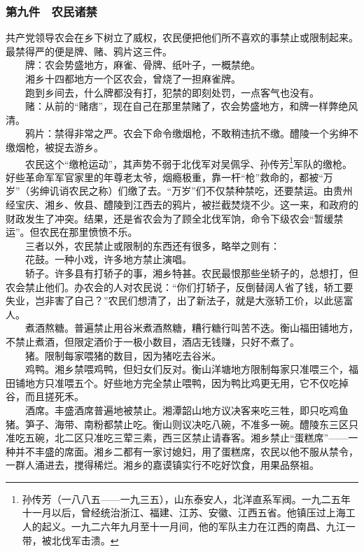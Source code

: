 \documentclass[cn,11pt,chinese]{elegantbook}
\def\myformat#1{\hfil\hfil #1}
\begin{document}
\subsubsection*{\myformat{第九件　农民诸禁}}
共产党领导农会在乡下树立了威权，农民便把他们所不喜欢的事禁止或限制起来。最禁得严的便是牌、赌、鸦片这三件。\\
　　牌：农会势盛地方，麻雀、骨牌、纸叶子，一概禁绝。\\
　　湘乡十四都地方一个区农会，曾烧了一担麻雀牌。\\
　　跑到乡间去，什么牌都没有打，犯禁的即刻处罚，一点客气也没有。\\
　　赌：从前的“赌痞”，现在自己在那里禁赌了，农会势盛地方，和牌一样弊绝风清。\\
　　鸦片：禁得非常之严。农会下命令缴烟枪，不敢稍违抗不缴。醴陵一个劣绅不缴烟枪，被捉去游乡。\\
　　农民这个“缴枪运动”，其声势不弱于北伐军对吴佩孚、孙传芳\footnote[20]{ 孙传芳（一八八五——一九三五），山东泰安人，北洋直系军阀。一九二五年十一月以后，曾经统治浙江、福建、江苏、安徽、江西五省。他镇压过上海工人的起义。一九二六年九月至十一月间，他的军队主力在江西的南昌、九江一带，被北伐军击溃。}军队的缴枪。好些革命军军官家里的年尊老太爷，烟瘾极重，靠一杆“枪”救命的，都被“万岁”（劣绅讥诮农民之称）们缴了去。“万岁”们不仅禁种禁吃，还要禁运。由贵州经宝庆、湘乡、攸县、醴陵到江西去的鸦片，被拦截焚烧不少。这一来，和政府的财政发生了冲突。结果，还是省农会为了顾全北伐军饷，命令下级农会“暂缓禁运”。但农民在那里愤愤不乐。\\
　　三者以外，农民禁止或限制的东西还有很多，略举之则有：\\
　　花鼓。一种小戏，许多地方禁止演唱。\\
　　轿子。许多县有打轿子的事，湘乡特甚。农民最恨那些坐轿子的，总想打，但农会禁止他们。办农会的人对农民说：“你们打轿子，反倒替阔人省了钱，轿工要失业，岂非害了自己？”农民们想清了，出了新法子，就是大涨轿工价，以此惩富人。\\
　　煮酒熬糖。普遍禁止用谷米煮酒熬糖，糟行糖行叫苦不迭。衡山福田铺地方，不禁止煮酒，但限定酒价于一极小数目，酒店无钱赚，只好不煮了。\\
　　猪。限制每家喂猪的数目，因为猪吃去谷米。\\
　　鸡鸭。湘乡禁喂鸡鸭，但妇女们反对。衡山洋塘地方限制每家只准喂三个，福田铺地方只准喂五个。好些地方完全禁止喂鸭，因为鸭比鸡更无用，它不仅吃掉谷，而且搓死禾。\\
　　酒席。丰盛酒席普遍地被禁止。湘潭韶山地方议决客来吃三牲，即只吃鸡鱼猪。笋子、海带、南粉都禁止吃。衡山则议决吃八碗，不准多一碗。醴陵东三区只准吃五碗，北二区只准吃三荤三素，西三区禁止请春客。湘乡禁止“蛋糕席”——一种并不丰盛的席面。湘乡二都有一家讨媳妇，用了蛋糕席，农民以他不服从禁令，一群人涌进去，搅得稀烂。湘乡的嘉谟镇实行不吃好饮食，用果品祭祖。\\
\end{document}
